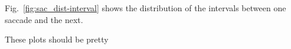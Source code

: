 Fig.~\ref{fig:sac_dist-interval} shows the distribution of the intervals between one saccade and the next. 

These plots should be pretty 